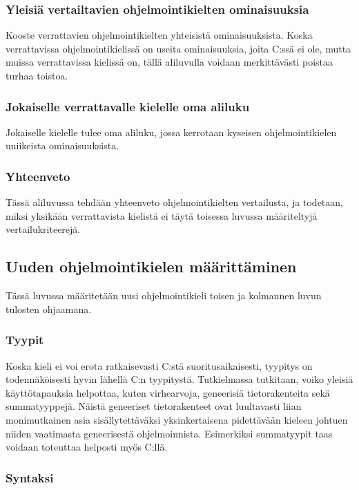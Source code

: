 \subsubsection{Yleisiä vertailtavien ohjelmointikielten ominaisuuksia}

Kooste verrattavien ohjelmointikielten yhteisistä ominaisuuksista. Koska
verrattavissa ohjelmointikielissä on useita ominaisuuksia, joita C:ssä ei ole,
mutta muissa verrattavissa kielissä on, tällä aliluvulla voidaan merkittävästi
poistaa turhaa toistoa.

\subsubsection{Jokaiselle verrattavalle kielelle oma aliluku}

Jokaiselle kielelle tulee oma aliluku, jossa kerrotaan kyseisen
ohjelmointikielen uniikeista ominaisuuksista.

\subsubsection{Yhteenveto}

Tässä aliluvussa tehdään yhteenveto ohjelmointikielten vertailusta, ja
todetaan, miksi yksikään verrattavista kielistä ei täytä toisessa luvussa
määriteltyjä vertailukriteerejä.

\subsection{Uuden ohjelmointikielen määrittäminen}

Tässä luvussa määritetään uusi ohjelmointikieli toisen ja kolmannen luvun
tulosten ohjaamana.

\subsubsection{Tyypit}

Koska kieli ei voi erota ratkaisevasti C:stä suoritusaikaisesti, tyypitys on
todennäköisesti hyvin lähellä C:n tyypitystä. Tutkielmassa tutkitaan, voiko
yleisiä käyttötapauksia helpottaa, kuten virhearvoja, geneerisiä
tietorakenteita sekä summatyyppejä. Näistä geneeriset tietorakenteet ovat
luultavasti liian monimutkainen asia sisällytettäväksi yksinkertaisena
pidettävään kieleen johtuen niiden vaatimasta geneerisestä ohjelmoinnista.
Esimerkiksi summatyypit taas voidaan toteuttaa helposti myös C:llä.

\subsubsection{Syntaksi}

